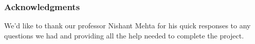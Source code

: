 \documentclass{article}
\begin{document}
\FloatBarrier

\subsubsection*{Acknowledgments}

We'd like to thank our professor Nishant Mehta for his quick responses to any
questions we had and providing all the help needed to complete the project.

\newpage


% 



\end{document}
